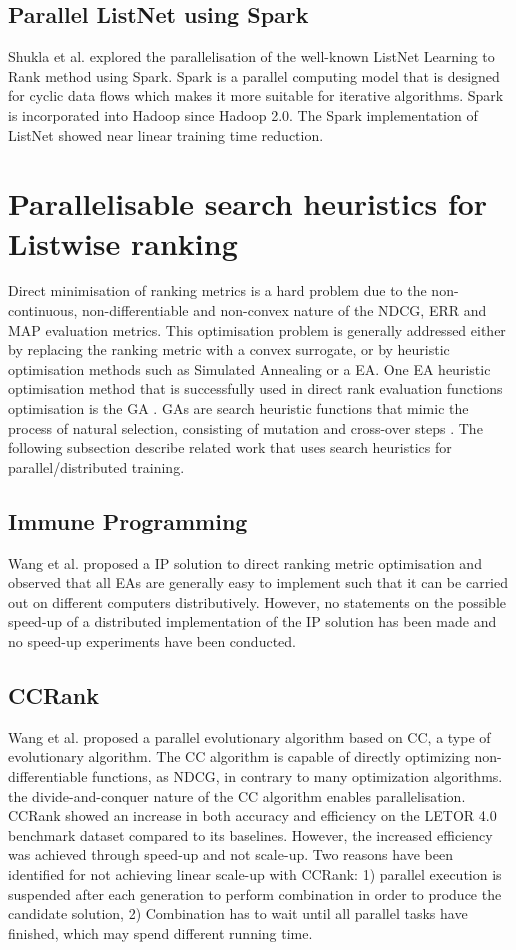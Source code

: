 \subsection{Parallel ListNet using Spark}
Shukla et al. \cite{Shukla2012} explored the parallelisation of the well-known ListNet Learning to Rank method using Spark. Spark is a parallel computing model that is designed for cyclic data flows which makes it more suitable for iterative algorithms. Spark is incorporated into Hadoop since Hadoop 2.0. The Spark implementation of ListNet showed near linear training time reduction.\\

\section{Parallelisable search heuristics for Listwise ranking}
Direct minimisation of ranking metrics is a hard problem due to the non-continuous, non-differentiable and non-convex nature of the \ac{NDCG}, \ac{ERR} and \ac{MAP} evaluation metrics. This optimisation problem is generally addressed either by replacing the ranking metric with a convex surrogate, or by heuristic optimisation methods such as Simulated Annealing or a \ac{EA}. One \ac{EA} heuristic optimisation method that is successfully used in direct rank evaluation functions optimisation is the \ac{GA} \cite{Yeh2007}. \ac{GA}s are search heuristic functions that mimic the process of natural selection, consisting of mutation and cross-over steps \cite{Holland1995}. The following subsection describe related work that uses search heuristics for parallel/distributed training.
\subsection{Immune Programming}
Wang et al. \cite{Wang2009b} proposed a \ac{IP} solution to direct ranking metric optimisation and observed that all \ac{EA}s are generally easy to implement such that it can be carried out on different computers distributively. However, no statements on the possible speed-up of a distributed implementation of the \ac{IP} solution has been made and no speed-up experiments have been conducted.
\subsection{CCRank}
Wang et al. \cite{Wang2011a,Wang2011b} proposed a parallel evolutionary algorithm based on \ac{CC}, a type of evolutionary algorithm. The \ac{CC} algorithm is capable of directly optimizing non-differentiable functions, as \ac{NDCG}, in contrary to many optimization algorithms.  the divide-and-conquer nature of the \ac{CC} algorithm enables parallelisation. CCRank showed an increase in both accuracy and efficiency on the LETOR 4.0 benchmark dataset compared to its baselines. However, the increased efficiency was achieved through speed-up and not scale-up. Two reasons have been identified for not achieving linear scale-up with CCRank: 1) parallel execution is suspended after each generation to perform combination in order to produce the candidate solution, 2) Combination has to wait until all parallel tasks have finished, which may spend different running time.
